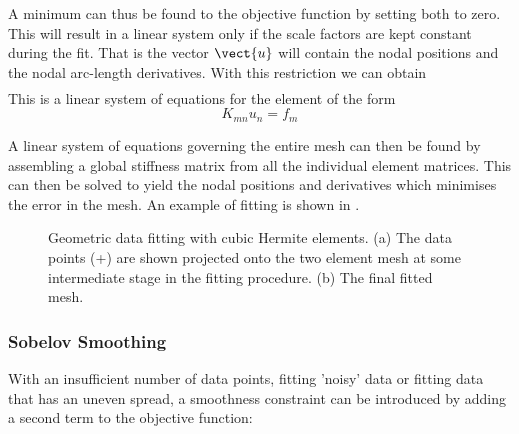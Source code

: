 A minimum can thus be found to the objective function by setting both 
 to zero. This will result in
a linear system only if the scale factors are kept constant during the fit. 
That is the vector $\vect{u}$ will contain the nodal positions and the nodal
arc-length derivatives. With this restriction we can obtain
\begin{eqnarray*}
\end{eqnarray*}
This is a linear system of equations for the element of the form
\begin{equation}
  K_{mn}u_{n}=f_{m}
  \label{eqn:linsystem}
\end{equation}

A linear system of equations governing the entire mesh can then be found by
assembling a global stiffness matrix from all the individual element matrices.
This can then be solved to yield the nodal positions and derivatives which
minimises the error in the mesh. An example of fitting is shown in
.

\begin{figure} \centering
  
  \caption{Geometric data fitting with cubic Hermite elements. (a) The data
     points (+) are shown projected onto the two element mesh at some 
     intermediate stage in the fitting procedure. (b) The final fitted mesh.}
  \label{fig:cubHermfit}
\end{figure}

\subsubsection{Sobelov Smoothing}

With an insufficient number of data points, fitting 'noisy' data or fitting
data that has an uneven spread, a smoothness constraint \citep{young:1989}
can be introduced by adding a second term to the objective function:

